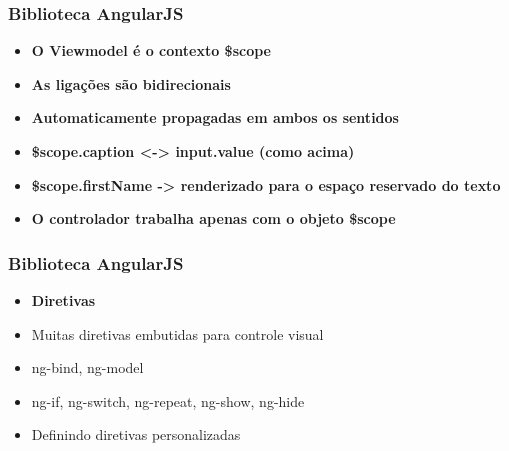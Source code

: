 \documentclass{beamer}
\begin{document}
\begin{frame}
      \frametitle{Biblioteca AngularJS}

      \begin{itemize}
            \item \textbf{O Viewmodel é o contexto \$scope}
            \item \textbf{As ligações são bidirecionais}
            \item \textbf{Automaticamente propagadas em ambos os sentidos}
            \item \textbf{\$scope.caption <-> input.value (como acima)}
            \item \textbf{\$scope.firstName -> renderizado para o espaço reservado do texto}
            \item \textbf{O controlador trabalha apenas com o objeto \$scope}
      \end{itemize}

\end{frame}

\begin{frame}
      \frametitle{Biblioteca AngularJS}

      \begin{itemize}
            \item \textbf{Diretivas}
            \item Muitas diretivas embutidas para controle visual
            \item ng-bind, ng-model
            \item ng-if, ng-switch, ng-repeat, ng-show, ng-hide
            \item Definindo diretivas personalizadas
      \end{itemize}

\end{frame}
\end{document}
